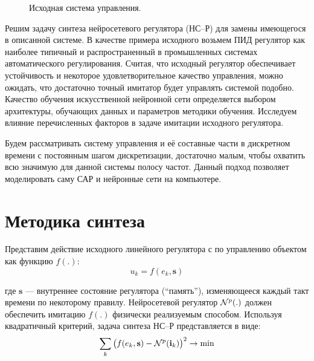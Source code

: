 \begin{figure}[h]
  \centering
  
  \caption{Исходная система управления.}
  \label{fig:ctrlloop}
\end{figure}

Решим задачу синтеза нейросетевого регулятора (НС--Р) для замены
имеющегося в описанной системе.  В качестве примера исходного возьмем
ПИД регулятор как наиболее типичный и распространенный в промышленных
системах автоматического регулирования.  Считая, что исходный
регулятор обеспечивает устойчивость и некоторое удовлетворительное
качество управления, можно ожидать, что достаточно точный имитатор
будет управлять системой подобно.  Качество обучения искусственной
нейронной сети определяется выбором архитектуры, обучающих данных и
параметров методики обучения.  Исследуем влияние перечисленных
факторов в задаче имитации исходного регулятора.

Будем рассматривать систему управления и её составные части в
дискретном времени с постоянным шагом дискретизации, достаточно малым,
чтобы охватить всю значимую для данной системы полосу частот.  Данный
подход позволяет моделировать саму САР и нейронные сети на компьютере.


\section{Методика синтеза}

Представим действие исходного линейного регулятора с
 по управлению объектом как функцию $f(.)$:
\begin{equation}\label{eq:raw_controller}
  u_k=f(e_k,\mathbf{s})
\end{equation}

\noindent где $\mathbf{s}$ --- внутреннее состояние регулятора
(``память''), изменяющееся каждый такт времени по некоторому правилу.
Нейросетевой регулятор $\mathcal{N}^p(.)$ должен обеспечить имитацию $f(.)$
физически реализуемым способом.  Используя квадратичный критерий,
задача синтеза НС--Р представляется в виде:
\begin{equation}\label{eq:nnp_synthesis_task}
  \sum\limits_k\big(f(e_k,\mathbf{s})-\NN^p(\mathbf{i}_k)\big)^2\rightarrow\min
\end{equation}

